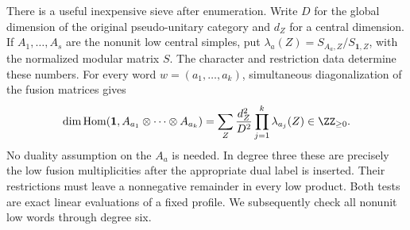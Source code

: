 There is a useful inexpensive sieve after enumeration.  Write $D$ for the
global dimension of the original pseudo-unitary category and $d_Z$ for a
central dimension.  If $A_1,\ldots,A_s$ are the nonunit low central simples,
put $\lambda_a(Z)=S_{A_a,Z}/S_{\mathbf1,Z}$, with the normalized modular
matrix $S$.  The character and restriction data determine these numbers.
For every word $w=(a_1,\ldots,a_k)$, simultaneous diagonalization of the
fusion matrices gives
\begin{equation}
\label{eq:round4-word-multiplicity}
 \dim\operatorname{Hom}(\mathbf1,A_{a_1}\otimes\cdots\otimes A_{a_k})
 =\sum_Z\frac{d_Z^2}{D^2}\prod_{j=1}^k\lambda_{a_j}(Z)
 \in\ZZ_{\geq0}.
\end{equation}
No duality assumption on the $A_a$ is needed.  In degree three these are
precisely the low fusion multiplicities after the appropriate dual label
is inserted.  Their restrictions must leave a nonnegative remainder in
every low product.  Both tests are exact linear evaluations of a fixed
profile.  We subsequently check all nonunit low words through degree six.

